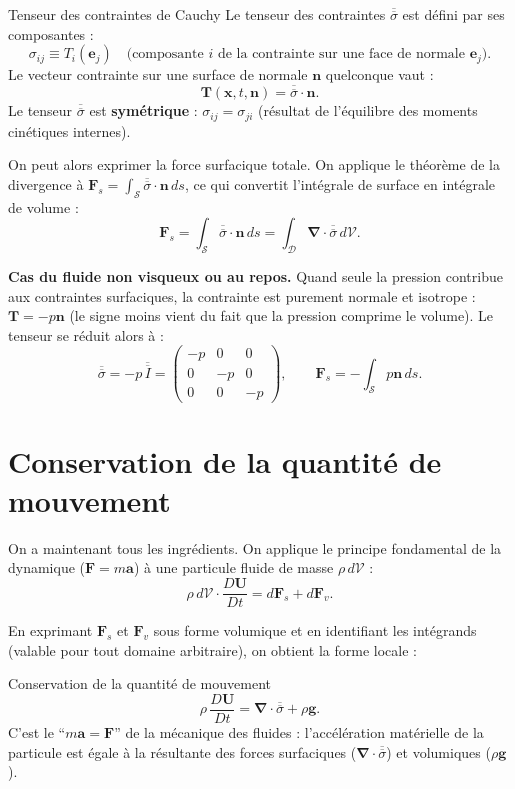 \documentclass[11pt,a4paper]{report}
\newcommand{\ten}[1]{\overline{\overline{#1}}}   %
\begin{document}
\begin{defbox}{Tenseur des contraintes de Cauchy}
Le tenseur des contraintes $\ten{\sigma}$ est défini par ses composantes :
\[
    \sigma_{ij} \equiv T_i(\bm{e}_j)
    \quad \text{(composante }i\text{ de la contrainte sur une face de normale }\bm{e}_j\text{)}.
\]
Le vecteur contrainte sur une surface de normale $\bm{n}$ quelconque vaut :
\[
    \bm{T}(\bm{x},t,\bm{n}) = \ten{\sigma}\cdot\bm{n}.
\]
Le tenseur $\ten{\sigma}$ est \textbf{symétrique} : $\sigma_{ij} = \sigma_{ji}$
(résultat de l'équilibre des moments cinétiques internes).
\end{defbox}

On peut alors exprimer la force surfacique totale. On applique le théorème de la
divergence à $\bm{F}_s = \int_\mathcal{S}\ten{\sigma}\cdot\bm{n}\,ds$, ce qui
convertit l'intégrale de surface en intégrale de volume :
\[
    \bm{F}_s = \int_{\mathcal{S}} \ten{\sigma}\cdot\bm{n}\,ds
             = \int_{\mathcal{D}} \boldsymbol{\nabla}\cdot\ten{\sigma}\,d\mathcal{V}.
\]

\textbf{Cas du fluide non visqueux ou au repos.} Quand seule la pression contribue
aux contraintes surfaciques, la contrainte est purement normale et isotrope :
$\bm{T} = -p\bm{n}$ (le signe moins vient du fait que la pression comprime le
volume). Le tenseur se réduit alors à :
\[
    \ten{\sigma} = -p\,\ten{I}
    = \begin{pmatrix} -p & 0 & 0 \\ 0 & -p & 0 \\ 0 & 0 & -p \end{pmatrix},
    \qquad
    \bm{F}_s = -\int_\mathcal{S} p\bm{n}\,ds.
\]

\section{Conservation de la quantité de mouvement}

On a maintenant tous les ingrédients. On applique le principe fondamental de la
dynamique ($\bm{F} = m\bm{a}$) à une particule fluide de masse $\rho\,d\mathcal{V}$ :
\[
    \rho\,d\mathcal{V}\cdot\frac{D\bm{U}}{Dt}
    = d\bm{F}_s + d\bm{F}_v.
\]

En exprimant $\bm{F}_s$ et $\bm{F}_v$ sous forme volumique et en identifiant les
intégrands (valable pour tout domaine arbitraire), on obtient la forme locale :

\begin{importantbox}{Conservation de la quantité de mouvement}
\[
    \rho\,\frac{D\bm{U}}{Dt} = \boldsymbol{\nabla}\cdot\ten{\sigma} + \rho\bm{g}.
\]
C'est le ``$m\bm{a} = \bm{F}$'' de la mécanique des fluides : l'accélération
matérielle de la particule est égale à la résultante des forces surfaciques
($\boldsymbol{\nabla}\cdot\ten{\sigma}$) et volumiques ($\rho\bm{g}$).
\end{importantbox}
\end{document}
